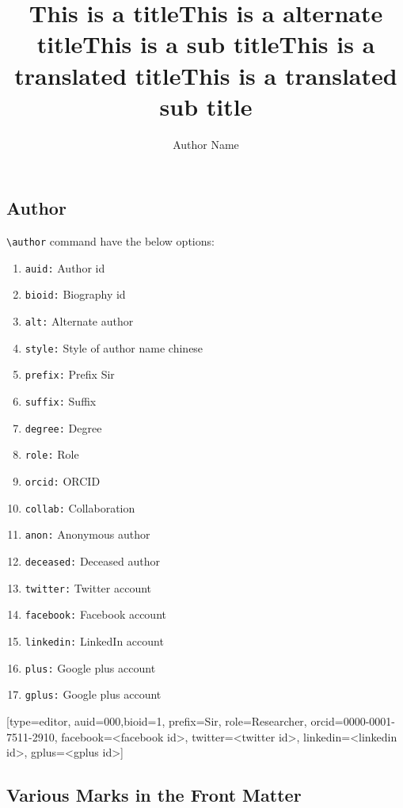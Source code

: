 \documentclass[a4paper,12pt]{article}
\begin{document}
\begin{vquote}
 \title[mode=title]{This is a title}
 \title[mode=alt]{This is a alternate title}
 \title[mode=sub]{This is a sub title}
 \title[mode=trans]{This is a translated title}
 \title[mode=transsub]{This is a translated sub title}
\end{vquote}


\subsection{Author}
\verb+\author+ command have the below options: 

\begin{enumerate}
\item \verb+auid:+ Author id
\item \verb+bioid:+ Biography id
\item \verb+alt:+ Alternate author
\item \verb+style:+ Style of author name chinese
\item \verb+prefix:+ Prefix Sir
\item \verb+suffix:+ Suffix
\item \verb+degree:+ Degree
\item \verb+role:+ Role
\item \verb+orcid:+ ORCID
\item \verb+collab:+ Collaboration
\item \verb+anon:+ Anonymous author
\item \verb+deceased:+ Deceased author
\item \verb+twitter:+ Twitter account
\item \verb+facebook:+ Facebook account
\item \verb+linkedin:+ LinkedIn account
\item \verb+plus:+ Google plus account
\item \verb+gplus:+ Google plus account
\end{enumerate}

\begin{vquote}
\author[1,3]{Author Name}[type=editor,
    auid=000,bioid=1,
    prefix=Sir,
    role=Researcher,
    orcid=0000-0001-7511-2910,
    facebook=<facebook id>,
    twitter=<twitter id>,
    linkedin=<linkedin id>,
    gplus=<gplus id>]
\end{vquote}

\subsection{Various Marks in the Front Matter}
\end{document}
